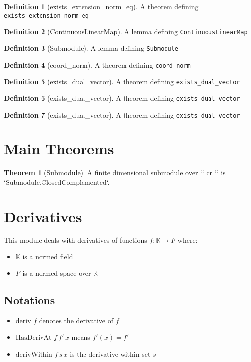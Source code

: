 \documentclass{article}
\theoremstyle{definition}
\newtheorem{definition}{Definition}
\newtheorem{theorem}{Theorem}
\begin{document}
\begin{definition}[exists_extension_norm_eq]
A theorem defining \texttt{exists_extension_norm_eq}
\end{definition}

\begin{definition}[ContinuousLinearMap]
A lemma defining \texttt{ContinuousLinearMap}
\end{definition}

\begin{definition}[Submodule]
A lemma defining \texttt{Submodule}
\end{definition}

\begin{definition}[coord_norm]
A theorem defining \texttt{coord_norm}
\end{definition}

\begin{definition}[exists_dual_vector]
A theorem defining \texttt{exists_dual_vector}
\end{definition}

\begin{definition}[exists_dual_vector]
A theorem defining \texttt{exists_dual_vector}
\end{definition}

\begin{definition}[exists_dual_vector]
A theorem defining \texttt{exists_dual_vector}
\end{definition}

\section{Main Theorems}
\begin{theorem}[Submodule]
A finite dimensional submodule over `` or `` is `Submodule.ClosedComplemented`.
\end{theorem}

\section{Derivatives}
This module deals with derivatives of functions $f : \mathbb{K} \to F$ where:
\begin{itemize}
\item $\mathbb{K}$ is a normed field
\item $F$ is a normed space over $\mathbb{K}$
\end{itemize}

\subsection{Notations}
\begin{itemize}
\item $\text{deriv } f$ denotes the derivative of $f$
\item $\text{HasDerivAt } f \, f' \, x$ means $f'(x) = f'$
\item $\text{derivWithin } f \, s \, x$ is the derivative within set $s$
\end{itemize}
\end{document}
